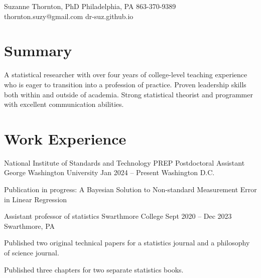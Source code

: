 \documentclass[letterpaper]{resume_config}
\begin{document}
\Header
    {Suzanne Thornton, PhD} %
    {Philadelphia, PA} %
    {863-370-9389} %
    {thornton.suzy@gmail.com} %
    {dr-suz.github.io} %

\section{Summary}
A statistical researcher with over four years of college-level teaching experience who is eager to transition into a profession of practice. Proven leadership skills both within and outside of academia. Strong statistical theorist and programmer with excellent communication abilities. 


\section{Work Experience}
\WorkExperience
    {National Institute of Standards and Technology PREP Postdoctoral Assistant} %
    {George Washington University} %
    {Jan 2024 -- Present} %
    {Washington D.C.} %
    {
        \item Publication in progress: A Bayesian Solution to Non-standard Measurement Error in Linear Regression 
    } 

\WorkExperience
    {Assistant professor of statistics} %
    {Swarthmore College} %
    {Sept 2020 -- Dec 2023} %
    {Swarthmore, PA} %
    {
        \item Published two original technical papers for a statistics journal and a philosophy of science journal. 
        \item Published three chapters for two separate statistics books. %
       
    } 
\end{document}
